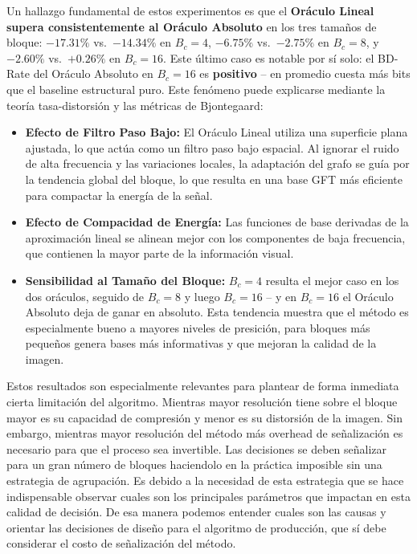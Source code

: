 Un hallazgo fundamental de estos experimentos es que el \textbf{Oráculo Lineal supera
consistentemente al Oráculo Absoluto} en los tres tamaños de bloque: $-17.31\%$ vs.\ $-14.34\%$ en
$B_c=4$, $-6.75\%$ vs.\ $-2.75\%$ en $B_c=8$, y $-2.60\%$ vs.\ $+0.26\%$ en $B_c=16$. Este último
caso es notable por sí solo: el BD-Rate del Oráculo Absoluto en $B_c=16$ es \textbf{positivo} --
en promedio cuesta más bits que el baseline estructural puro. Este fenómeno puede explicarse
mediante la teoría tasa-distorsión y las métricas de Bjontegaard:

\begin{itemize}
    \item \textbf{Efecto de Filtro Paso Bajo:} El Oráculo Lineal utiliza una superficie plana ajustada, lo que actúa como un filtro paso bajo espacial. Al ignorar el ruido de alta frecuencia y las variaciones locales, la adaptación del grafo se guía por la tendencia global del bloque, lo que resulta en una base GFT más eficiente para compactar la energía de la señal.
    \item \textbf{Efecto de Compacidad de Energía:} Las funciones de base derivadas de la aproximación lineal se alinean mejor con los componentes de baja frecuencia, que contienen la mayor parte de la información visual.
    \item \textbf{Sensibilidad al Tamaño del Bloque:} $B_c=4$ resulta el mejor caso en los dos
    oráculos, seguido de $B_c=8$ y luego $B_c=16$ -- y en $B_c=16$ el Oráculo Absoluto deja de
    ganar en absoluto. Esta tendencia muestra que el método es especialmente bueno a mayores niveles de presición, para bloques más pequeños genera bases más informativas y que mejoran la calidad de la imagen.
\end{itemize}

Estos resultados son especialmente relevantes para plantear de forma inmediata cierta limitación del algoritmo. Mientras mayor resolución tiene sobre el bloque mayor es su capacidad de compresión y menor es su distorsión de la imagen. Sin embargo, mientras mayor resolución del método más overhead de señalización es necesario para que el proceso sea invertible. Las decisiones se deben señalizar para un gran número de bloques haciendolo en la práctica imposible sin una estrategia de agrupación.
Es debido a la necesidad de esta estrategia que se hace indispensable observar cuales son los principales parámetros que impactan en esta calidad de decisión. De esa manera podemos entender cuales son las causas y orientar las decisiones de diseño para el algoritmo de producción, que sí debe considerar el costo de señalización del método.


